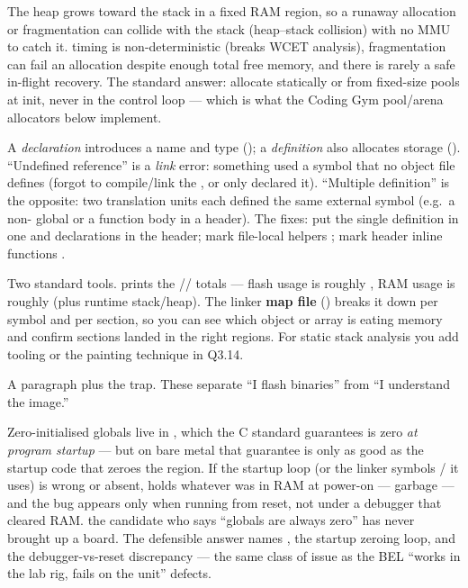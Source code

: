 The heap grows toward the stack in a fixed RAM region, so a runaway allocation
or fragmentation can collide with the stack (heap--stack collision) with no
MMU to catch it.  timing is non-deterministic (breaks WCET
analysis), fragmentation can fail an allocation despite enough total free
memory, and there is rarely a safe in-flight recovery. The standard answer:
allocate statically or from fixed-size pools at init, never in the control
loop --- which is what the Coding Gym pool/arena allocators below implement.

A \emph{declaration} introduces a name and type (); a
\emph{definition} also allocates storage (). ``Undefined
reference'' is a \emph{link} error: something used a symbol that no object
file defines (forgot to compile/link the , or only declared it).
``Multiple definition'' is the opposite: two translation units each defined
the same external symbol (e.g.\ a non- global or a function body
in a header). The fixes: put the single definition in one  and
 declarations in the header; mark file-local helpers
; mark header inline functions .

Two standard tools.  prints the //
 totals --- flash usage is roughly , RAM usage is
roughly  (plus runtime stack/heap). The linker \textbf{map
file} () breaks it down per symbol and per section, so
you can see which object or array is eating memory and confirm sections landed
in the right regions. For static stack analysis you add tooling or the painting
technique in Q3.14.

%
{A paragraph plus the trap. These separate ``I flash binaries'' from
``I understand the image.''}

Zero-initialised globals live in , which the C standard guarantees
is zero \emph{at program startup} --- but on bare metal that guarantee is only
as good as the startup code that zeroes the  region. If the startup
loop (or the linker symbols / it uses) is wrong or
absent,  holds whatever was in RAM at power-on --- garbage --- and
the bug appears only when running from reset, not under a debugger that
cleared RAM. \trap the candidate who says ``globals are always zero'' has never
brought up a board. The defensible answer names , the startup
zeroing loop, and the debugger-vs-reset discrepancy --- the same class of
issue as the BEL ``works in the lab rig, fails on the unit'' defects.

